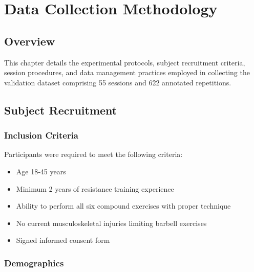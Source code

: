 
\chapter{Data Collection Methodology} \label{chap:methodology}

\section{Overview}

This chapter details the experimental protocols, subject recruitment criteria, session procedures, and data management practices employed in collecting the validation dataset comprising 55 sessions and 622 annotated repetitions.

\section{Subject Recruitment}

\subsection{Inclusion Criteria}

Participants were required to meet the following criteria:
\begin{itemize}
    \item Age 18-45 years
    \item Minimum 2 years of resistance training experience
    \item Ability to perform all six compound exercises with proper technique
    \item No current musculoskeletal injuries limiting barbell exercises
    \item Signed informed consent form
\end{itemize}

\subsection{Demographics}

